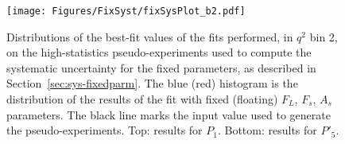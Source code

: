 

\begin{figure}[!hbt]
  \centering
  \texttt{[image: Figures/FixSyst/fixSysPlot\_b2.pdf]}
  \caption{Distributions of the best-fit values of the fits performed, in $q^2$ bin 2, on the high-statistics pseudo-experiments used to compute the systematic uncertainty for the fixed parameters, as described in Section~\ref{sec:sys-fixedparm}. The blue (red) histogram is the distribution of the results of the fit with fixed (floating) $F_L$, $F_s$, $A_s$ parameters. The black line marks the input value used to generate the pseudo-experiments. Top: results for $P_1$. Bottom: results for $P'_5$. }
  \label{fig:fixSyst2}
\end{figure}


